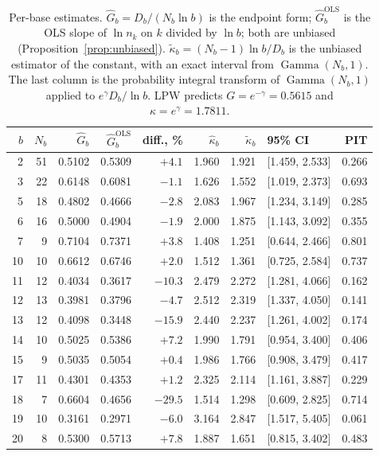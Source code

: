 \documentclass[11pt,a4paper]{article}
\theoremstyle{plain}
\theoremstyle{remark}
\newcommand{\eg}{e^{\gamma}}
\newcommand{\emg}{e^{-\gamma}}
\DeclareMathOperator{\Gam}{Gamma}
\begin{document}
\begin{table}[t]
\centering
\caption{Per-base estimates. $\hat G_b=D_b/(N_b\ln b)$ is the endpoint form;
$\hat G_b^{\mathrm{OLS}}$ is the OLS slope of $\ln n_k$ on $k$ divided by
$\ln b$; both are unbiased (Proposition~\ref{prop:unbiased}).
$\tilde\kappa_b=(N_b-1)\ln b/D_b$ is the unbiased estimator of the constant,
with an exact interval from $\Gam(N_b,1)$. The last column is the probability
integral transform of $\Gam(N_b,1)$ applied to $\eg D_b/\ln b$. LPW predicts
$G=\emg=0.5615$ and $\kappa=\eg=1.7811$.}
\label{tab:bases}
\small
\begin{tabular}{rrrrrrrlr}
\toprule
$b$ & $N_b$ & $\hat G_b$ & $\hat G_b^{\mathrm{OLS}}$ & diff., \% &
$\hat\kappa_b$ & $\tilde\kappa_b$ & 95\% CI & PIT\\
\midrule
2 & 51 & 0.5102 & 0.5309 & $+4.1$ & 1.960 & 1.921 & [1.459, 2.533] & 0.266\\
3 & 22 & 0.6148 & 0.6081 & $-1.1$ & 1.626 & 1.552 & [1.019, 2.373] & 0.693\\
5 & 18 & 0.4802 & 0.4666 & $-2.8$ & 2.083 & 1.967 & [1.234, 3.149] & 0.285\\
6 & 16 & 0.5000 & 0.4904 & $-1.9$ & 2.000 & 1.875 & [1.143, 3.092] & 0.355\\
7 & 9 & 0.7104 & 0.7371 & $+3.8$ & 1.408 & 1.251 & [0.644, 2.466] & 0.801\\
10 & 10 & 0.6612 & 0.6746 & $+2.0$ & 1.512 & 1.361 & [0.725, 2.584] & 0.737\\
11 & 12 & 0.4034 & 0.3617 & $-10.3$ & 2.479 & 2.272 & [1.281, 4.066] & 0.162\\
12 & 13 & 0.3981 & 0.3796 & $-4.7$ & 2.512 & 2.319 & [1.337, 4.050] & 0.141\\
13 & 12 & 0.4098 & 0.3448 & $-15.9$ & 2.440 & 2.237 & [1.261, 4.002] & 0.174\\
14 & 10 & 0.5025 & 0.5386 & $+7.2$ & 1.990 & 1.791 & [0.954, 3.400] & 0.406\\
15 & 9 & 0.5035 & 0.5054 & $+0.4$ & 1.986 & 1.766 & [0.908, 3.479] & 0.417\\
17 & 11 & 0.4301 & 0.4353 & $+1.2$ & 2.325 & 2.114 & [1.161, 3.887] & 0.229\\
18 & 7 & 0.6604 & 0.4656 & $-29.5$ & 1.514 & 1.298 & [0.609, 2.825] & 0.714\\
19 & 10 & 0.3161 & 0.2971 & $-6.0$ & 3.164 & 2.847 & [1.517, 5.405] & 0.061\\
20 & 8 & 0.5300 & 0.5713 & $+7.8$ & 1.887 & 1.651 & [0.815, 3.402] & 0.483\\
\bottomrule
\end{tabular}
\end{table}
\end{document}
